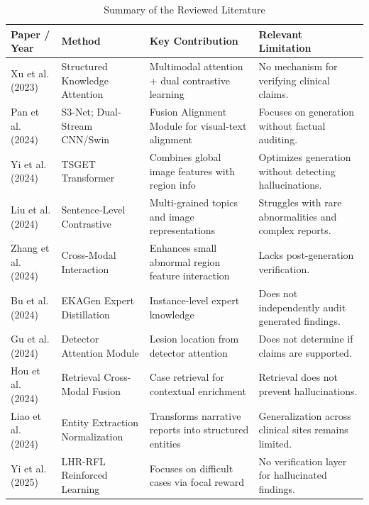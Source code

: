 \documentclass[12pt,a4paper]{report}
\begin{document}
\begin{table}[htbp]
\centering
\small
\caption{Summary of the Reviewed Literature}
\label{tab:lit_review}
\begin{tabularx}{\textwidth}{p{2.2cm}p{3cm}Xp{3.8cm}}
\toprule
\textbf{Paper / Year} & \textbf{Method} & \textbf{Key Contribution} & \textbf{Relevant Limitation} \\
\midrule
Xu et al. (2023) \cite{xu2023radiology} & Structured Knowledge Attention & Multimodal attention + dual contrastive learning & No mechanism for verifying clinical claims. \\
Pan et al. (2024) \cite{pan2024s3} & S3-Net; Dual-Stream CNN/Swin & Fusion Alignment Module for visual-text alignment & Focuses on generation without factual auditing. \\
Yi et al. (2024) \cite{yi2024tsget} & TSGET Transformer & Combines global image features with region info & Optimizes generation without detecting hallucinations. \\
Liu et al. (2024) \cite{liu2024multi} & Sentence-Level Contrastive & Multi-grained topics and image representations & Struggles with rare abnormalities and complex reports. \\
Zhang et al. (2024) \cite{zhang2024visual} & Cross-Modal Interaction & Enhances small abnormal region feature interaction & Lacks post-generation verification. \\
Bu et al. (2024) \cite{bu2024ekagen} & EKAGen Expert Distillation & Instance-level expert knowledge & Does not independently audit generated findings. \\
Gu et al. (2024) \cite{gu2024automatic} & Detector Attention Module & Lesion location from detector attention & Does not determine if claims are supported. \\
Hou et al. (2024) \cite{hou2024retrieval} & Retrieval Cross-Modal Fusion & Case retrieval for contextual enrichment & Retrieval does not prevent hallucinations. \\
Liao et al. (2024) \cite{liao2024information} & Entity Extraction Normalization & Transforms narrative reports into structured entities & Generalization across clinical sites remains limited. \\
Yi et al. (2025) \cite{yi2025lhr} & LHR-RFL Reinforced Learning & Focuses on difficult cases via focal reward & No verification layer for hallucinated findings. \\
\bottomrule
\end{tabularx}
\end{table}
\end{document}
